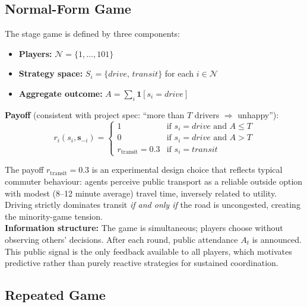 \documentclass[letterpaper]{article}
\begin{document}
\subsection{Normal-Form Game}

The stage game is defined by three components: \\

\begin{itemize}
    \item \textbf{Players:} $\mathcal{N} = \{1,\ldots, 101\}$
    \item \textbf{Strategy space:} $S_i = \{\textit{drive},\, \textit{transit}\}$ for each $i \in \mathcal{N}$
    \item \textbf{Aggregate outcome:} $A = \sum_{i} \mathbf{1}[s_i = \textit{drive}]$
\end{itemize}

\textbf{Payoff} (consistent with project spec: ``more than $T$ drivers $\Rightarrow$ unhappy''): \\

\begin{equation}
r_i(s_i, \mathbf{s}_{-i}) = \begin{cases} 1 & \text{if } s_i = \textit{drive} \text{ and } A \leq T \\ 0 & \text{if } s_i = \textit{drive} \text{ and } A > T \\ r_{\text{transit}} = 0.3 & \text{if } s_i = \textit{transit} \end{cases}
\end{equation}

The payoff $r_{\text{transit}} = 0.3$ is an experimental design choice that reflects typical commuter behaviour: agents perceive public transport as a reliable outside option with modest (8--12 minute average) travel time, inversely related to utility. Driving strictly dominates transit \textit{if and only if} the road is uncongested, creating the minority-game tension. \\

\textbf{Information structure:} The game is simultaneous; players choose without observing others' decisions. After each round, public attendance $A_t$ is announced. This public signal is the only feedback available to all players, which motivates predictive rather than purely reactive strategies for sustained coordination. \\

\subsection{Repeated Game}
\end{document}
